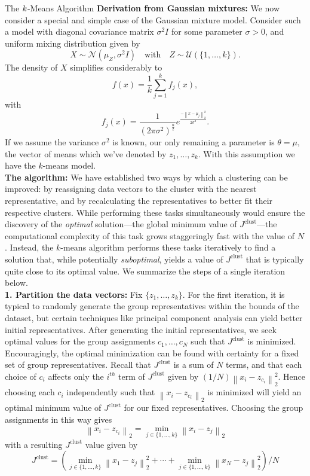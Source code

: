 \documentclass{article}
\newcommand{\norm}[2]{\left \lVert #1 \right \rVert_{#2}}
\begin{document}
\begin{section}{The $\boldmath{k}$-Means Algorithm}
\textbf{Derivation from Gaussian mixtures:} We now consider a special and simple case of the Gaussian mixture model. Consider such a model with diagonal covariance matrix $\sigma^2I$ for some parameter $\sigma > 0$, and uniform mixing distribution given by
\[X \sim \mathcal{N}(\mu_Z,\sigma^2I)\quad\text{with}\quad Z \sim \mathcal{U}(\{1,\ldots,k\}).\]
The density of $X$ simplifies considerably to
\[f(x) = \frac{1}{k}\sum_{j=1}^{k}{f_j(x)},\]
with
\[f_j(x) = \frac{1}{(2\pi\sigma^2)^{\frac{n}{2}}}e^{\frac{-\norm{x-\mu_j}{2}^{2}}{2\sigma^{2}}}.\]
If we assume the variance $\sigma^{2}$ is known, our only remaining a parameter is $\theta = \mu$, the vector of means which we've denoted by $z_1,\ldots,z_k$. With this assumption we have the $k$-means model.\\

\textbf{The algorithm:} We have established two ways by which a clustering can be improved: by reassigning data vectors to the cluster with the nearest representative, and by recalculating the representatives to better fit their respective clusters.  While performing these tasks simultaneously would ensure the discovery of the \textit{optimal} solution---the global minimum value of $J^{\text{clust}}$---the computational complexity of this task grows staggeringly fast with the value of $N$. Instead, the $k$-means algorithm performs these tasks iteratively to find a solution that, while potentially \textit{suboptimal}, yields a value of $J^{\text{clust}}$ that is typically quite close to its optimal value. We summarize the steps of a single iteration below.\\

\adjustwidth{3em}{0pt}\textbf{1. Partition the data vectors:} Fix $\{z_1,\ldots ,z_k\}$. For the first iteration, it is typical to randomly generate the group representatives within the bounds of the dataset, but certain techniques like principal component analysis can yield better initial representatives. After generating the initial representatives, we seek optimal values for the group assignments $c_1,\ldots ,c_N$ such that $J^{\text{clust}}$ is minimized. Encouragingly, the optimal minimization can be found with certainty for a fixed set of group representatives. Recall that $J^{\text{clust}}$ is a sum of $N$ terms, and that each choice of $c_i$ affects only the $i^{th}$ term of $J^{\text{clust}}$ given by $(1/N)\norm{x_{i} - z_{c_{i}}}{2}^{2}$. Hence choosing each $c_i$ independently such that $\norm{x_{i} - z_{c_{i}}}{2}$ is minimized will yield an optimal minimum value of $J^{\text{clust}}$ for our fixed representatives. Choosing the group assignments in this way gives
\[\norm{x_{i} - z_{c_{i}}}{2} = \min_{j \in \{1,\ldots,k\}}\norm{x_{i} - z_{j}}{2}\]
with a resulting $J^{\text{clust}}$ value given by
\[J^{\text{clust}} =  \left(\min_{j \in \{1,\ldots,k\}}\norm{x_{1} - z_{j}}{2}^{2}+\cdots+\min_{j \in \{1,\ldots,k\}}\norm{x_{N} - z_{j}}{2}^{2}\right )/N\]


\end{section}
\end{document}
